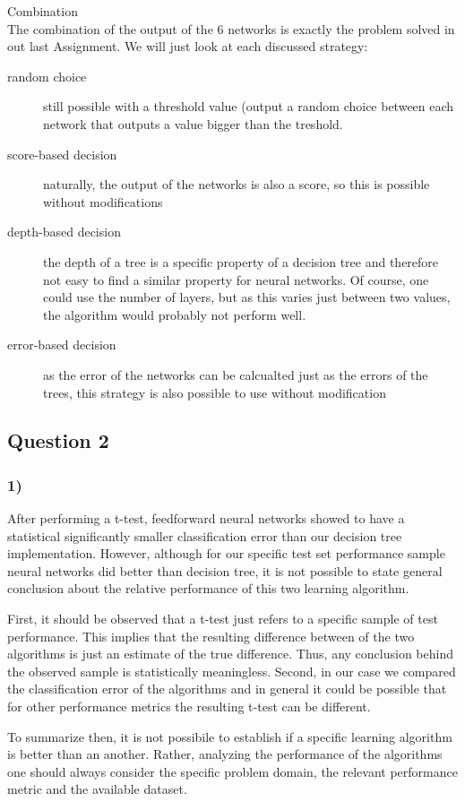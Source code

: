 \documentclass{article}
\begin{document}
Combination\\
The combination of the output of the 6 networks is exactly the problem solved in out last Assignment. We will just look at each discussed strategy:
\begin{description}
    \item[random choice] still possible with a threshold value (output a random choice between each network that outputs a value bigger than the treshold.
    \item[score-based decision] naturally, the output of the networks is also a score, so this is possible without modifications
    \item[depth-based decision] the depth of a tree is a specific property of a decision tree and therefore not easy to find a similar property for neural networks. Of course, one could use the number of layers, but as this varies just between two values, the algorithm would probably not perform well.
    \item[error-based decision] as the error of the networks can be calcualted just as the errors of the trees, this strategy is also possible to use without modification
\end{description}

\subsection{Question 2}
\subsubsection*{1)}
After performing a t-test, feedforward neural networks showed to have a statistical significantly smaller classification error than our decision tree implementation. However, although for our specific test set performance sample neural networks did better than decision tree, it is not possible to state general conclusion about the relative performance of this two learning algorithm. 

First, it should be observed that a t-test just refers to a specific sample of test performance. This implies that the resulting difference between of the two algorithms is just an estimate of the true difference. Thus, any conclusion behind the observed sample is statistically meaningless. Second, in our case we compared the classification error of the algorithms and in general it could be possible that for other performance metrics the resulting t-test can be different. 

To summarize then, it is not possibile to establish if a specific learning algorithm is better than an another. Rather, analyzing the performance of the algorithms one should always consider the specific problem domain, the relevant performance metric and the available dataset.
\end{document}

